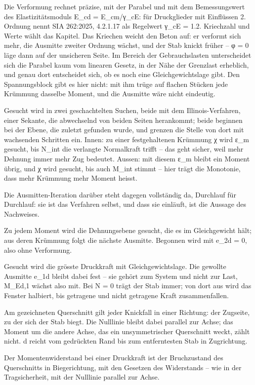\documentclass[11pt,a4paper]{article}
\begin{document}
Die Verformung rechnet präzise, mit der Parabel und mit dem Bemessungswert des Elastizitätsmoduls E\_cd = E\_cm/γ\_cE: für Druckglieder mit Einflüssen 2. Ordnung nennt SIA 262:2025, 4.2.1.17 als Regelwert γ\_cE = 1.2. Kriechzahl und Werte wählt das Kapitel. Das Kriechen weicht den Beton auf: er verformt sich mehr, die Ausmitte zweiter Ordnung wächst, und der Stab knickt früher – φ = 0 läge dann auf der unsicheren Seite. Im Bereich der Gebrauchslasten unterscheidet sich die Parabel kaum vom linearen Gesetz, in der Nähe der Grenzlast erheblich, und genau dort entscheidet sich, ob es noch eine Gleichgewichtslage gibt. Den Spannungsblock gibt es hier nicht: mit ihm trüge auf flachen Stücken jede Krümmung dasselbe Moment, und die Ausmitte wäre nicht eindeutig.

Gesucht wird in zwei geschachtelten Suchen, beide mit dem Illinois-Verfahren, einer Sekante, die abwechselnd von beiden Seiten herankommt; beide beginnen bei der Ebene, die zuletzt gefunden wurde, und grenzen die Stelle von dort mit wachsenden Schritten ein. Innen: zu einer festgehaltenen Krümmung χ wird ε\_m gesucht, bis N\_int die verlangte Normalkraft trifft – das geht sicher, weil mehr Dehnung immer mehr Zug bedeutet. Aussen: mit diesem ε\_m bleibt ein Moment übrig, und χ wird gesucht, bis auch M\_int stimmt – hier trägt die Monotonie, dass mehr Krümmung mehr Moment heisst.

Die Ausmitten-Iteration darüber steht dagegen vollständig da, Durchlauf für Durchlauf: sie ist das Verfahren selbst, und dass sie einläuft, ist die Aussage des Nachweises.

Zu jedem Moment wird die Dehnungsebene gesucht, die es im Gleichgewicht hält; aus deren Krümmung folgt die nächste Ausmitte. Begonnen wird mit e\_2d = 0, also ohne Verformung.

Gesucht wird die grösste Druckkraft mit Gleichgewichtslage. Die gewollte Ausmitte e\_1d bleibt dabei fest – sie gehört zum System und nicht zur Last, M\_Ed,1 wächst also mit. Bei N = 0 trägt der Stab immer; von dort aus wird das Fenster halbiert, bis getragene und nicht getragene Kraft zusammenfallen.

Am gezeichneten Querschnitt gilt jeder Knickfall in einer Richtung: der Zugseite, zu der sich der Stab biegt. Die Nulllinie bleibt dabei parallel zur Achse; das Moment um die andere Achse, das ein unsymmetrischer Querschnitt weckt, zählt nicht. d reicht vom gedrückten Rand bis zum entferntesten Stab in Zugrichtung.

Der Momentenwiderstand bei einer Druckkraft ist der Bruchzustand des Querschnitts in Biegerichtung, mit den Gesetzen des Widerstands – wie in der Tragsicherheit, mit der Nulllinie parallel zur Achse.
\end{document}
